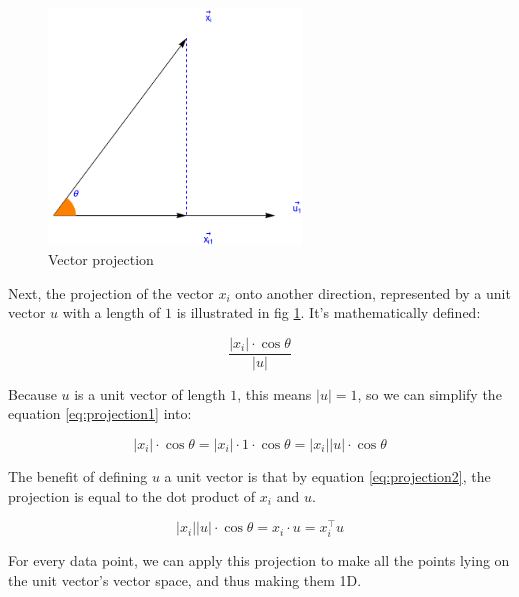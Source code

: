 \documentclass[stu,12pt,floatsintext]{apa7}
\begin{document}
\begin{figure}[h]
    \centering
    \includegraphics[width=0.6\textwidth]{images/vector-projection.png}
    \caption{Vector projection}
    \label{fig:vector-proejction}
\end{figure}

Next, the projection of the vector $x_i$ onto another direction, represented by a unit vector $u$ with a length of $1$ is illustrated in fig \ref{fig:vector-proejction}. It's mathematically defined:

\begin{equation}
    \label{eq:projection1}
    \frac{|x_i|\cdot \cos \theta}{|u|}
\end{equation}


Because $u$ is a unit vector of length $1$, this means $|u|=1$, so we can simplify the equation \ref{eq:projection1} into:

\begin{equation}
    \label{eq:projection2}
    |x_i|\cdot \cos \theta=|x_i|\cdot 1\cdot \cos \theta=|x_i||u|\cdot \cos \theta
\end{equation}

The benefit of defining $u$ a unit vector is that by equation \ref{eq:projection2}, the projection is equal to the dot product of $x_i$ and $u$. 

\begin{equation}
    \label{eq:projection3}
    |x_i||u|\cdot \cos \theta = x_i\cdot u=x_i^\top  u
\end{equation}




For every data point, we can apply this projection to make all the points lying on the unit vector's vector space, and thus making them 1D. 
\end{document}
